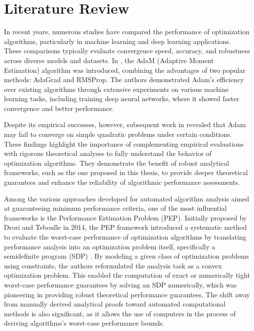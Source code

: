 \chapter{Literature Review}\label{chapter:literature}

In recent years, numerous studies have compared the performance of optimization algorithms, particularly in machine learning and deep learning applications. These comparisons typically evaluate convergence speed, accuracy, and robustness across diverse models and datasets. In \cite{adam}, the AdaM (Adaptive Moment Estimation) algorithm was introduced, combining the advantages of two popular methods: AdaGrad and RMSProp. The authors demonstrated Adam's efficiency over existing algorithms through extensive experiments on various machine learning tasks, including training deep neural networks, where it showed faster convergence and better performance.

Despite its empirical successes, however, subsequent work in \cite{adam2} revealed that Adam may fail to converge on simple quadratic problems under certain conditions. These findings highlight the importance of complementing empirical evaluations with rigorous theoretical analyses to fully understand the behavior of optimization algorithms. They demonstrate the benefit of robust analytical frameworks, such as the one proposed in this thesis, to provide deeper theoretical guarantees and enhance the reliability of algorithmic performance assessments.

Among the various approaches developed for automated algorithm analysis aimed at guaranteeing minimum performance criteria, one of the most influential frameworks is the Performance Estimation Problem (PEP). Initially proposed by Drori and Teboulle in 2014, the PEP framework introduced a systematic method to evaluate the worst-case performance of optimization algorithms by translating performance analysis into an optimization problem itself, specifically a semidefinite program (SDP) \cite{drori2012}. By modeling a given class of optimization problems using constraints, the authors reformulated the analysis task as a convex optimization problem. This enabled the computation of exact or numerically tight worst-case performance guarantees by solving an SDP numerically, which was pioneering in providing robust theoretical performance guarantees. The shift away from manually derived analytical proofs toward automated computational methods is also significant, as it allows the use of computers in the process of deriving algorithms's worst-case performance bounds.

